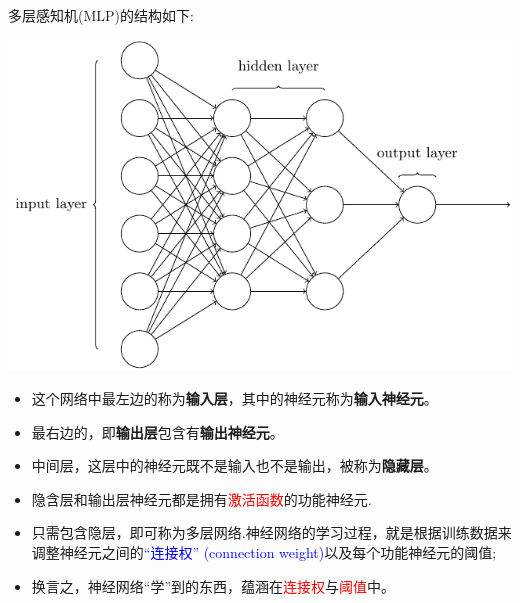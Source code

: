 多层感知机(MLP)的结构如下:
\begin{center}
  \includegraphics{figure//tikz11}
\end{center}

\begin{itemize}
\item 这个网络中最左边的称为\textbf{输入层}，其中的神经元称为\textbf{输入神经元}。

\item 最右边的，即\textbf{输出层}包含有\textbf{输出神经元}。

\item 中间层，这层中的神经元既不是输入也不是输出，被称为\textbf{隐藏层}。 

\item 隐含层和输出层神经元都是拥有\textcolor{red}{激活函数}的功能神经元. 

\item 只需包含隐层，即可称为多层网络.神经网络的学习过程，就是根据训练数据来调整神经元之间的\textcolor{blue}{“连接权” (connection weight)}以及每个功能神经元的阈值;

\item 换言之，神经网络“学”到的东西，蕴涵在\textcolor{red}{连接权}与\textcolor{red}{阈值}中。

\end{itemize}
